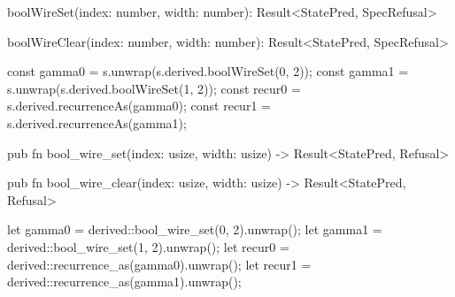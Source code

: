 \begin{tssrc}
boolWireSet(index: number, width: number): Result<StatePred, SpecRefusal>

boolWireClear(index: number, width: number): Result<StatePred, SpecRefusal>
\end{tssrc}
\begin{tssrc}
const gamma0 = s.unwrap(s.derived.boolWireSet(0, 2));
const gamma1 = s.unwrap(s.derived.boolWireSet(1, 2));
const recur0 = s.derived.recurrenceAs(gamma0);
const recur1 = s.derived.recurrenceAs(gamma1);
\end{tssrc}
\begin{rustsrc}
pub fn bool_wire_set(index: usize, width: usize) -> Result<StatePred, Refusal>

pub fn bool_wire_clear(index: usize, width: usize) -> Result<StatePred, Refusal>
\end{rustsrc}
\begin{rustsrc}
let gamma0 = derived::bool_wire_set(0, 2).unwrap();
let gamma1 = derived::bool_wire_set(1, 2).unwrap();
let recur0 = derived::recurrence_as(gamma0).unwrap();
let recur1 = derived::recurrence_as(gamma1).unwrap();
\end{rustsrc}
